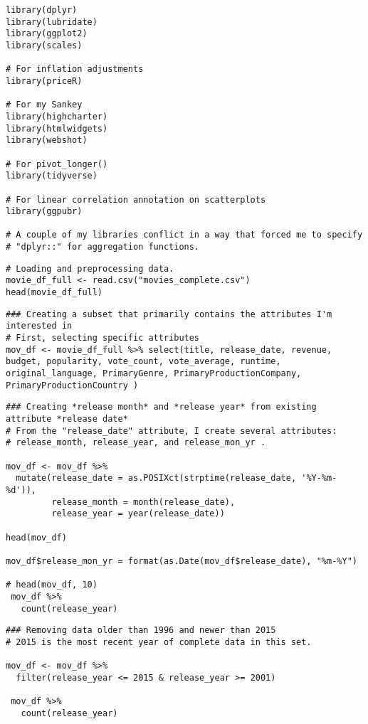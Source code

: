 \lstset{style=rstyle}

\begin{lstlisting}
library(dplyr)
library(lubridate)
library(ggplot2)
library(scales)

# For inflation adjustments
library(priceR)

# For my Sankey
library(highcharter)
library(htmlwidgets)
library(webshot)

# For pivot_longer()
library(tidyverse)

# For linear correlation annotation on scatterplots
library(ggpubr)

# A couple of my libraries conflict in a way that forced me to specify 
# "dplyr::" for aggregation functions.
\end{lstlisting}

\begin{lstlisting}
# Loading and preprocessing data.
movie_df_full <- read.csv("movies_complete.csv")
head(movie_df_full)
\end{lstlisting}

\begin{lstlisting}
### Creating a subset that primarily contains the attributes I'm interested in
# First, selecting specific attributes
mov_df <- movie_df_full %>% select(title, release_date, revenue, budget, popularity, vote_count, vote_average, runtime, original_language, PrimaryGenre, PrimaryProductionCompany, PrimaryProductionCountry )
\end{lstlisting}

\begin{lstlisting}
### Creating *release month* and *release year* from existing attribute *release date*
# From the "release_date" attribute, I create several attributes:
# release_month, release_year, and release_mon_yr .

mov_df <- mov_df %>%
  mutate(release_date = as.POSIXct(strptime(release_date, '%Y-%m-%d')),
         release_month = month(release_date),
         release_year = year(release_date))

head(mov_df)

mov_df$release_mon_yr = format(as.Date(mov_df$release_date), "%m-%Y")

# head(mov_df, 10)
 mov_df %>%
   count(release_year)
\end{lstlisting}

\begin{lstlisting}
### Removing data older than 1996 and newer than 2015
# 2015 is the most recent year of complete data in this set.

mov_df <- mov_df %>%
  filter(release_year <= 2015 & release_year >= 2001)

 mov_df %>%
   count(release_year)
\end{lstlisting}

